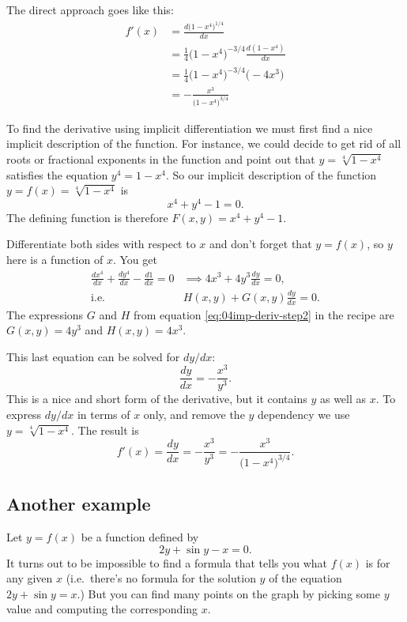 The direct approach goes like this:
\begin{align*}
  f'(x) &= \frac{d\bigl(1-x^4\bigr)^{1/4}}{dx} \\
  &= \tfrac14 \bigl(1-x^4\bigr)^{-3/4}\frac{d(1-x^4)}{dx}\\
  &= \tfrac14 \bigl(1-x^4\bigr)^{-3/4}\bigl(-4x^3\bigr)\\
  &=-\frac{x^3}{\bigl(1-x^4\bigr)^{3/4}}
\end{align*}




To find the derivative using implicit differentiation we must first
find a nice implicit description of the function.  For instance, we
could decide to get rid of all roots or fractional exponents in the
function and point out that $y=\sqrt[4]{1-x^4}$ satisfies the equation
$y^4 = 1-x^4$.  So our implicit description of the function $y=f(x)=
\sqrt[4]{1-x^4}$ is
\[
x^4+y^4-1=0.
\]
The defining function is therefore $F(x,y) = x^4+y^4-1$.




Differentiate both sides with respect to $x$ and don't forget that
$y=f(x)$, so $y$ here is a function of $x$.  You get
\begin{align*}
  \frac{d x^4}{dx} + \frac{dy^4}{dx} -\frac{d1}{dx} =0
  &\implies 4x^3 + 4y^3 \frac{dy}{dx} = 0, \\
  \text{i.e. }& H(x, y) + G(x, y) \frac{dy} {dx} = 0.
\end{align*}
The expressions $G$ and $H$ from equation \eqref{eq:04imp-deriv-step2}
in the recipe are $G(x,y) = 4y^3$ and $H(x, y) = 4x^3$.




This last equation can be solved for $dy/dx$:
\[
\frac{dy}{dx} = -\frac{x^3}{y^3}.
\]
This is a nice and short form of the derivative, but it contains $y$ as well as
$x$.  To express $dy/dx$ in terms of $x$ only, and remove the $y$
dependency we use $y=\sqrt[4]{1-x^4}$.  The result is
\[
f'(x) = \frac{dy}{dx} =
-\frac{x^3}{y^3}=-\frac{x^3}{\bigl(1-x^4\bigr)^{3/4}}.
\]




\subsection{Another example} 
Let $y=f(x)$ be a function defined by
\[
2y+\sin y - x=0.
\]
It turns out to be impossible to find a formula that tells you what
$f(x)$ is for any given $x$ (i.e.~there's no formula for the solution
$y$ of the equation $2y+\sin y =x$.)  But you can find many points on
the graph by picking some $y$ value and computing the corresponding
$x$.




